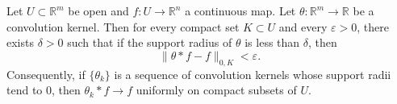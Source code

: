 Let $U \subset \mathbb{R}^m$ be open and $f: U \to \mathbb{R}^n$ a continuous map. Let $\theta: \mathbb{R}^m \to \mathbb{R}$ be a convolution kernel. Then for every compact set $K \subset U$ and every $\varepsilon > 0$, there exists $\delta > 0$ such that if the support radius of $\theta$ is less than $\delta$, then
$$\|\theta * f - f\|_{0, K} < \varepsilon.$$
Consequently, if $\{\theta_k\}$ is a sequence of convolution kernels whose support radii tend to $0$, then $\theta_k * f \to f$ uniformly on compact subsets of $U$.
